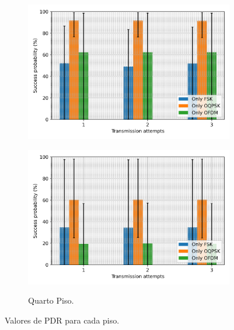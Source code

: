 \begin{figure}[ht!]
\begin{subfigure}{.4\textwidth}
        \includegraphics[width=\textwidth]{./sections/textual/chapters/images/mod_3_floor.png}
        \label{fig:piso3}
    \end{subfigure}
    \begin{subfigure}{.4\textwidth}
        \centering
        \caption{Quarto Piso.}
        \includegraphics[width=\textwidth]{./sections/textual/chapters/images/mod_4_floor.png}
        \label{fig:piso4}
    \end{subfigure}
    \caption{Valores de PDR para cada piso.}
    \label{fig:pdr_andar}
\end{figure}


